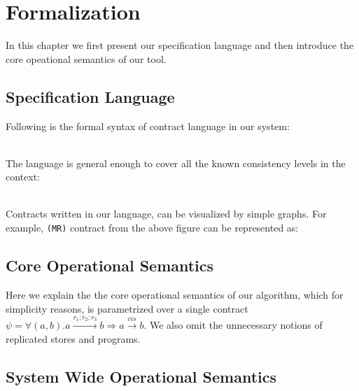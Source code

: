 \section{Formalization}
In this chapter we first present our specification language and then
introduce the core opeational semantics of our tool.
\subsection{Specification Language}
Following is the formal syntax of contract language in our system:

\\ The language is general enough to cover all  the known consistency
levels in the context:

\\ Contracts written in our language, can be visualized by simple graphs. For example, \texttt{(MR)} contract from the above figure can be represented as:



\newpage
\subsection{Core Operational Semantics}
Here we explain the the core operational semantics of our algorithm, which for simplicity reasons, 
is parametrized over a single contract 
$\psi = \forall (a,b). a \xrightarrow{r_1;r_2;r_3} b  \Rightarrow a \xrightarrow{vis} b$. 
We also omit the unnecessary notions of replicated stores and programs.




\subsection {System Wide Operational Semantics}



